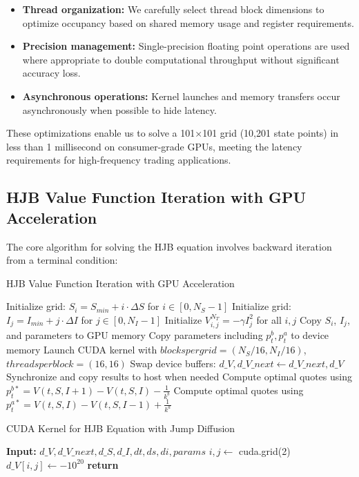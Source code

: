 \documentclass[onecolumn,ieee]{arithmaxresearch}
\begin{document}
\begin{onecolumn}
\begin{itemize}
    \item \textbf{Thread organization:} We carefully select thread block dimensions to optimize occupancy based on shared memory usage and register requirements.
    
    \item \textbf{Precision management:} Single-precision floating point operations are used where appropriate to double computational throughput without significant accuracy loss.
    
    \item \textbf{Asynchronous operations:} Kernel launches and memory transfers occur asynchronously when possible to hide latency.
\end{itemize}

These optimizations enable us to solve a 101×101 grid (10,201 state points) in less than 1 millisecond on consumer-grade GPUs, meeting the latency requirements for high-frequency trading applications.

\subsection{HJB Value Function Iteration with GPU Acceleration}

The core algorithm for solving the HJB equation involves backward iteration from a terminal condition:


\begin{algorithm}
\caption{HJB Value Function Iteration with GPU Acceleration}
\begin{algorithmic}[1]
\State Initialize grid: $S_i = S_{min} + i \cdot \Delta S$ for $i \in [0, N_S-1]$
\State Initialize grid: $I_j = I_{min} + j \cdot \Delta I$ for $j \in [0, N_I-1]$
\State Initialize $V^{N_T}_{i,j} = -\gamma I_j^2$ for all $i,j$
\State Copy $S_i$, $I_j$, and parameters to GPU memory
    \State Copy parameters including $p^b_t, p^a_t$ to device memory
    \State Launch CUDA kernel with $blockspergrid=(N_S/16, N_I/16)$, $threadsperblock=(16, 16)$
    \State Swap device buffers: $d\_V, d\_V\_next \gets d\_V\_next, d\_V$
    \State Synchronize and copy results to host when needed
\EndFor
\State Compute optimal quotes using $p^{b*}_t = V(t,S,I+1) - V(t,S,I) - \frac{1}{k^b}$
\State Compute optimal quotes using $p^{a*}_t = V(t,S,I) - V(t,S,I-1) + \frac{1}{k^a}$
\end{algorithmic}
\end{algorithm}


\begin{algorithm}
\caption{CUDA Kernel for HJB Equation with Jump Diffusion}
\begin{algorithmic}[1]
\State \textbf{Input:} $d\_V, d\_V\_next, d\_S, d\_I, dt, ds, di, params$
\State $i, j \gets$ cuda.grid(2)
        \State $d\_V[i,j] \gets -10^{20}$ 
        \State \textbf{return}
    \EndIf
    

\end{algorithmic}
\end{algorithm}
\end{onecolumn}
\end{document}
